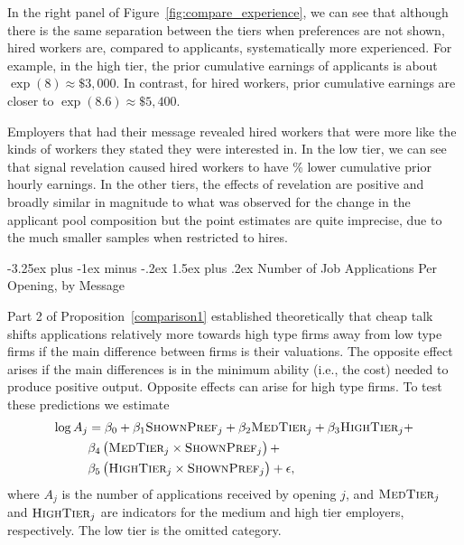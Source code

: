 \documentclass[12pt]{article}
\makeatletter
\renewcommand{\subsection}{%
  \@startsection{subsection}{2}{\z@}%
  {-3.25ex plus -1ex minus -.2ex}%
  {1.5ex plus .2ex}%
  {\normalfont\large\bfseries}%
}
\makeatother
\begin{document}
In the right panel of Figure~\ref{fig:compare_experience}, we can see that although there is the same separation between the tiers when preferences are not shown, hired workers are, compared to applicants, systematically more experienced.
For example, in the high tier, the prior cumulative earnings of applicants is about $\exp(8) \approx \$3,000$.
In contrast, for hired workers, prior cumulative earnings are closer to $\exp(8.6) \approx \$5,400$.

Employers that had their message revealed hired workers that were more like the kinds of workers they stated they were interested in. 
In the low tier, we can see that signal revelation caused hired workers to have \EffectEarningsExperienceLowTierHiredRegression{}\% lower cumulative prior hourly earnings.
In the other tiers, the effects of revelation are positive and broadly similar in magnitude to what was observed for the change in the applicant pool composition but the point estimates are quite imprecise, due to the much smaller samples when restricted to hires. 

\subsection{Number of Job Applications Per Opening, by Message} %

Part 2 of Proposition~\ref{comparison1} established theoretically that cheap talk shifts applications relatively more towards high type firms away from low type firms if the main difference between firms is their valuations. The opposite effect arises if the main differences is in the minimum ability (i.e., the cost) needed to produce positive output. Opposite effects can arise for high type firms. To test these predictions we estimate
\begin{align} \label{eq:appsi}
  \log A_{j} & = \beta_0 + \beta_1 \textsc{ShownPref}_j + \beta_2 \textsc{MedTier}_j + \beta_3 \textsc{HighTier}_j  + \nonumber\\  
           & \beta_4 \left(\textsc{MedTier}_j \times \textsc{ShownPref}_j \right) + \nonumber \\  
           & \beta_5 \left(\textsc{HighTier}_j \times \textsc{ShownPref}_j\right) + \epsilon,
\end{align}
where $A_j$ is the number of applications received by opening $j$, and $\textsc{MedTier}_j$ and $\textsc{HighTier}_j$ are indicators for the medium and high tier employers, respectively.
The low tier is the omitted category.
\end{document}
